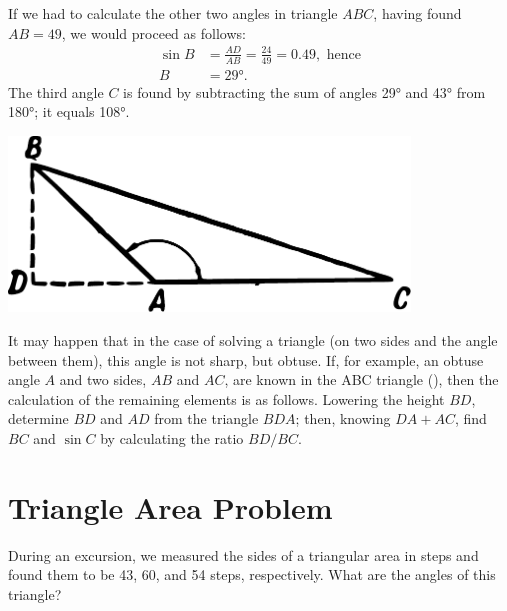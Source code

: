 If we had to calculate the other two angles in triangle $ABC$, having found $AB = 49$, we would proceed as follows: 
\begin{align*}%
\sin B & = \frac{AD}{AB}  = \frac{24}{49} = 0.49,\,\, \text{hence}\\ 
B & = \ang{29}. 
\end{align*}
The third angle $C$ is found by subtracting the sum of angles \ang{29} and \ang{43} from \ang{180}; it equals \ang{108}.


\begin{marginfigure}%
\centering
\includegraphics[width=0.8\textwidth]{figures/ch-05/fig-095.pdf}
\end{marginfigure}

It may happen that in the case of solving a triangle (on two sides and the angle between them), this angle is not sharp, but obtuse. If, for example, an obtuse angle $A$ and two sides, $AB$ and $AC$, are known in the ABC triangle (), then the calculation of the remaining elements is as follows. Lowering the height $BD$, determine $BD$ and $AD$ from the triangle $BDA$; then, knowing $DA + AC$, find $BC$ and $\sin C$ by calculating the ratio $BD / BC$.


\section{Triangle Area Problem}
\label{sec-5.7}

\ques During an excursion, we measured the sides of a triangular area in steps and found them to be 43, 60, and 54 steps, respectively. What are the angles of this triangle?



